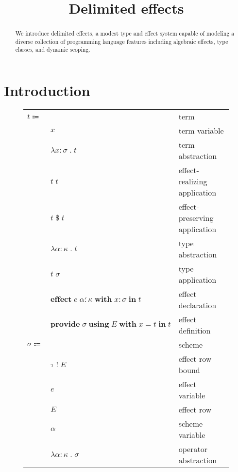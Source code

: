 \documentclass[12pt]{article}
\title{Delimited effects}
\date{}
\newcommand\lstof[1]{\overline{#1}}
\newcommand\eterm{t}
\newcommand\evar{x}
\newcommand\eabs[2]{\lambda #1 \; . \; #2} %
\newcommand\eapp[2]{#1 \; #2}
\newcommand\eappx[2]{#1 \; \$ \; #2}
\newcommand\etabs[2]{\lambda #1 \; . \; #2} %
\newcommand\etapp[2]{#1 \; #2}
\newcommand\eeffect[4]{\textbf{effect} \; #1 \; \textbf{with} \; \tanno{#2}{#3} \; \textbf{in} \; #4}
\newcommand\eprovide[5]{\textbf{provide} \; #1 \; \textbf{using} \; #2 \; \textbf{with} \; #3 = #4 \; \textbf{in} \; #5}
\newcommand\ttype{\tau}
\newcommand\tvar{\alpha}
\newcommand\tx{\sigma}
\newcommand\twithx[2]{#1 \; ! \; #2} %
\newcommand\tanno[2]{#1 : #2} %
\newcommand\ttabs[2]{\lambda #1 \; . \; #2} %
\newcommand\xeffects{E}
\newcommand\xtapp[2]{#1 \; #2} %
\newcommand\xeffect{e}
\newcommand\kkind{\kappa}
\begin{document}
  \maketitle

  \begin{abstract}
    We introduce delimited effects, a modest type and effect system capable of modeling a diverse collection of programming language features including algebraic effects, type classes, and dynamic scoping.
  \end{abstract}

  \section{Introduction}

  \begin{figure}
    \begin{mdframed}[backgroundcolor=none]
      \begin{center}
        \begin{tabular}{l l l}
          $\eterm \Coloneqq $ & & term \\
          & $\evar$ & term variable \\
          & $\eabs{\tanno{\evar}{\tx}}{\eterm}$ & term abstraction \\
          & $\eapp{\eterm}{\eterm}$ & effect-realizing application \\
          & $\eappx{\eterm}{\eterm}$ & effect-preserving application \\
          & $\etabs{\tanno{\tvar}{\kkind}}{\eterm}$ & type abstraction \\
          & $\etapp{\eterm}{\tx}$ & type application \\
          & $\eeffect{\xtapp{\xeffect}{\lstof{\tanno{\tvar}{\kkind}}}}{\evar}{\tx}{\eterm}$ & effect declaration \\
          & $\eprovide{\tx}{\xeffects}{\evar}{\eterm}{\eterm}$ & effect definition \\
          $\tx \Coloneqq$ & & scheme \\
          & $\twithx{\ttype}{\xeffects}$ & effect row bound \\
          & $\xeffect$ & effect variable \\
          & $\xeffects$ & effect row \\
          & $\tvar$ & scheme variable \\
          & $\ttabs{\tanno{\tvar}{\kkind}}{\tx}$ & operator abstraction \\

\end{tabular}
\end{center}
\end{mdframed}
\end{figure}
\end{document}
